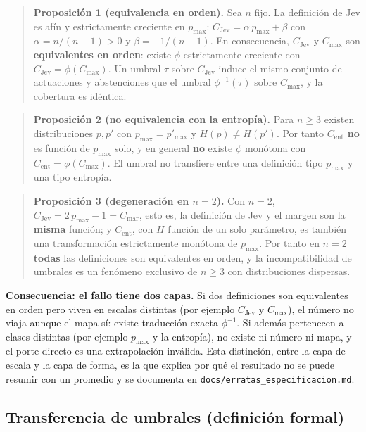\begin{quote}
\textbf{Proposición 1 (equivalencia en orden).} Sea $n$ fijo. La definición de Jev es afín y estrictamente
creciente en $p_{\max}$: $C_{\mathrm{Jev}} = \alpha\,p_{\max} + \beta$ con $\alpha = n/(n-1) > 0$ y
$\beta = -1/(n-1)$. En consecuencia, $C_{\mathrm{Jev}}$ y $C_{\max}$ son \textbf{equivalentes en orden}:
existe $\phi$ estrictamente creciente con $C_{\mathrm{Jev}} = \phi(C_{\max})$. Un umbral $\tau$ sobre
$C_{\mathrm{Jev}}$ induce el mismo conjunto de actuaciones y abstenciones que el umbral $\phi^{-1}(\tau)$
sobre $C_{\max}$, y la cobertura es idéntica.
\end{quote}

\begin{quote}
\textbf{Proposición 2 (no equivalencia con la entropía).} Para $n \ge 3$ existen distribuciones $p, p'$ con
$p_{\max} = p'_{\max}$ y $H(p) \ne H(p')$. Por tanto $C_{\mathrm{ent}}$ \textbf{no} es función de
$p_{\max}$ solo, y en general \textbf{no} existe $\phi$ monótona con $C_{\mathrm{ent}} = \phi(C_{\max})$. El
umbral no transfiere entre una definición tipo $p_{\max}$ y una tipo entropía.
\end{quote}

\begin{quote}
\textbf{Proposición 3 (degeneración en $n = 2$).} Con $n = 2$, $C_{\mathrm{Jev}} = 2\,p_{\max} - 1 =
C_{\mathrm{mar}}$, esto es, la definición de Jev y el margen son la \textbf{misma} función; y
$C_{\mathrm{ent}}$, con $H$ función de un solo parámetro, es también una transformación estrictamente
monótona de $p_{\max}$. Por tanto en $n = 2$ \textbf{todas} las definiciones son equivalentes en orden, y la
incompatibilidad de umbrales es un fenómeno exclusivo de $n \ge 3$ con distribuciones dispersas.
\end{quote}

\textbf{Consecuencia: el fallo tiene dos capas.} Si dos definiciones son equivalentes en orden pero viven en
escalas distintas (por ejemplo $C_{\mathrm{Jev}}$ y $C_{\max}$), el número no viaja aunque el
mapa sí: existe traducción exacta $\phi^{-1}$. Si además pertenecen a clases distintas
(por ejemplo $p_{\max}$ y la entropía), no existe ni número ni mapa, y el porte directo es una extrapolación
inválida. Esta distinción, entre la capa de escala y la capa de forma, es la que explica
por qué el resultado no se puede resumir con un promedio y se documenta en
\texttt{docs/erratas\_especificacion.md}.

\subsection{Transferencia de umbrales (definición formal)}

